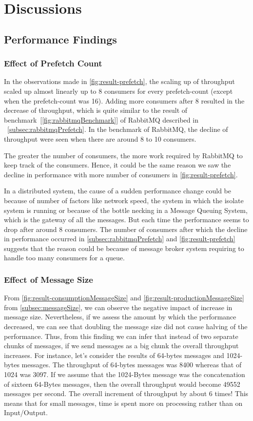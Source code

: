 \chapter{Discussions}\label{chapter:discussions}

\section{Performance Findings}
\subsection{Effect of Prefetch Count}
  In the observations made in \autoref{fig:result-prefetch}, the scaling up of throughput scaled up almost linearly up to 8 consumers for every prefetch-count (except when the prefetch-count was 16). Adding more consumers after 8 resulted in the decrease of throughput, which is quite similar to the result of benchmark~[\autoref{fig:rabbitmqBenchmark}] of RabbitMQ described in ~\autoref{subsec:rabbitmqPrefetch}. In the benchmark of RabbitMQ, the decline of throughput were seen when there are around 8 to 10 consumers.

  The greater the number of consumers, the more work required by RabbitMQ to keep track of the consumers. Hence, it could be the same reason we saw the decline in performance with more number of consumers in \autoref{fig:result-prefetch}.

  In a distributed system, the cause of a sudden performance change could be because of number of factors like network speed, the system in which the isolate system is running or because of the bottle necking in a Message Queuing System, which is the gateway of all the messages. But each time the performance seems to drop after around 8 consumers. The number of consumers after which the decline in performance occurred in \autoref{subsec:rabbitmqPrefetch} and \autoref{fig:result-prefetch} suggests that the reason could be because of message broker system requiring to handle too many consumers for a queue.

\subsection{Effect of Message Size}
  From \autoref{fig:result-consumptionMessageSize} and \autoref{fig:result-productionMessageSize} from \autoref{subsec:messageSize}, we can observe the negative impact of increase in message size. Nevertheless, if we assess the amount by which the performance decreased, we can see that doubling the message size did not cause halving of the performance. Thus, from this finding we can infer that instead of two separate chunks of messages, if we send messages as a big chunk the overall throughput increases. For instance, let's consider the results of 64-bytes messages and 1024-bytes messages. The throughput of 64-bytes messages was 8400 whereas that of 1024 was 3097. If we assume that the 1024-Bytes message was the concatenation of sixteen 64-Bytes messages, then the overall throughput would become 49552 messages per second. The overall increment of throughput by about 6 times! This means that for small messages, time is spent more on processing rather than on Input/Output.

